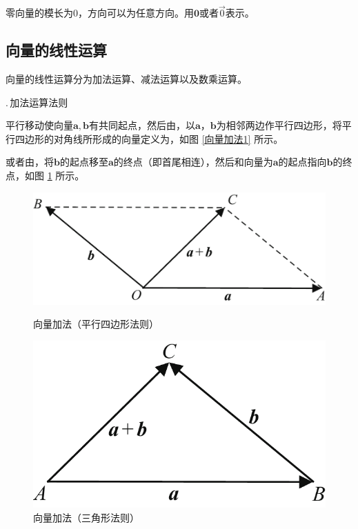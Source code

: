 \newpage

\vspace*{-2em}
零向量的模长为0，方向可以为任意方向。用$\boldsymbol{0}$或者$\vec{0}$表示。
\subsection{向量的线性运算}
向量的线性运算分为加法运算、减法运算以及数乘运算。

.$\,$加法运算法则

平行移动使向量$\boldsymbol{a},\boldsymbol{b}$有共同起点，然后由，以$\boldsymbol{a}，\boldsymbol{b}$为相邻两边作平行四边形，将平行四边形的对角线所形成的向量定义为，如图 \ref{向量加法1} 所示。

\par 或者由，将$\boldsymbol{b}$的起点移至$\boldsymbol{a}$的终点（即首尾相连），然后和向量为$\boldsymbol{a}$的起点指向$\boldsymbol{b}$的终点，如图 \ref{向量加法2} 所示。
\begin{figure}[h]
\centering
\begin{minipage}{0.55\linewidth}
	\centering
	\includegraphics[width = 0.8\linewidth]{pic/C-5/vecadd}
	\vspace*{-0.8em}
	\caption{向量加法（平行四边形法则）}
	\label{向量加法1}
\end{minipage}
\begin{minipage}{0.4\linewidth}
	\centering
	\includegraphics[width = 0.755\linewidth]{pic/C-5/vecadd2}
	\vspace*{-1em}
	\caption{向量加法（三角形法则）}
	\label{向量加法2}
\end{minipage}
\end{figure}
\vspace*{0.5em}


